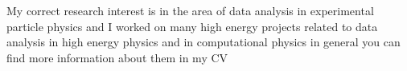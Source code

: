 My correct research interest is in the area of data analysis in experimental particle physics and I worked on many high energy projects related to data analysis in high energy physics and in computational physics in general you can find more information about them in my CV








 
